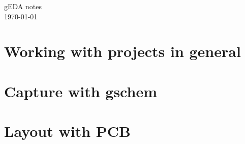
\newlength{\pad} \setlength{\pad}{.2cm}




\thispagestyle{empty} %
\begin{center}
  {\huge gEDA notes}\\
  \today
\end{center}
\clearpage

\pagestyle{toc}
\tableofcontents
\clearpage \pagestyle{normal}


\part{Working with projects in general}






\part{Capture with gschem}






\part{Layout with PCB}









% 

